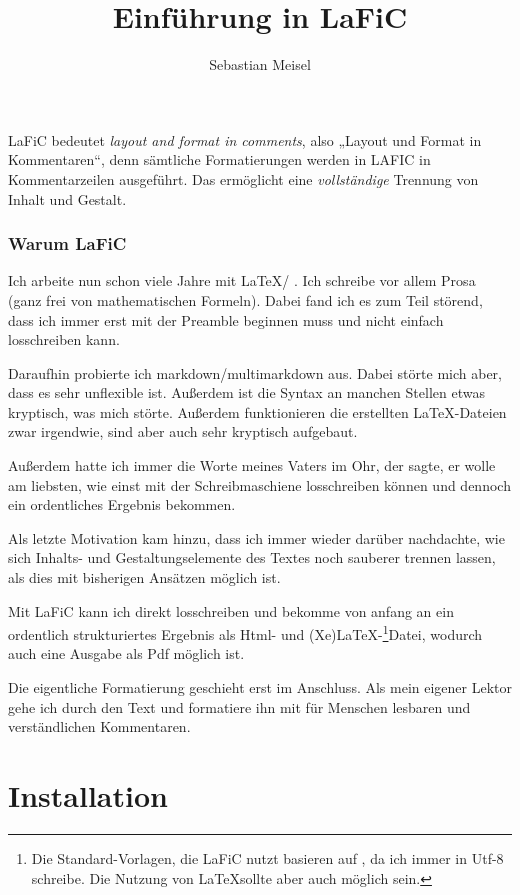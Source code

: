 \documentclass{scrartcl}
\title{Einführung in LaFiC}
\author{Sebastian Meisel}
\begin{document}
\maketitle


LaFiC bedeutet \textit{layout and format in comments}, also „Layout
und Format in Kommentaren“, denn sämtliche Formatierungen
werden in LAFIC in Kommentarzeilen ausgeführt. Das
ermöglicht eine \emph{vollständige} Trennung von Inhalt und
Gestalt.

\section{Warum LaFiC}

Ich arbeite nun schon viele Jahre mit \LaTeX / \XeLaTeX. Ich schreibe vor allem Prosa (ganz frei von mathematischen Formeln). Dabei fand ich es zum Teil störend, dass ich immer erst mit der Preamble beginnen muss und nicht einfach losschreiben kann.

Daraufhin probierte ich markdown/multimarkdown aus. Dabei störte mich aber, dass es sehr unflexible ist. Außerdem ist die Syntax an manchen Stellen etwas kryptisch, was mich störte. Außerdem funktionieren die erstellten \LaTeX-Dateien zwar irgendwie, sind aber auch sehr kryptisch aufgebaut.

Außerdem hatte ich immer die Worte meines Vaters im Ohr, der sagte, er wolle am liebsten, wie einst mit der Schreibmaschiene losschreiben können und dennoch ein ordentliches Ergebnis bekommen.

Als letzte Motivation kam hinzu, dass ich immer wieder darüber nachdachte, wie sich Inhalts- und Gestaltungselemente des Textes noch sauberer trennen lassen, als dies mit bisherigen Ansätzen möglich ist.

Mit LaFiC kann ich direkt losschreiben und bekomme von anfang an ein ordentlich strukturiertes Ergebnis als Html- und (Xe)LaTeX-\footnote{Die Standard-Vorlagen, die LaFiC nutzt basieren auf \XeLaTeX, da ich immer in Utf-8 schreibe. Die Nutzung von \LaTeX sollte aber auch möglich sein.}Datei, wodurch auch  eine Ausgabe als Pdf möglich ist.

Die eigentliche Formatierung geschieht erst im Anschluss. Als mein eigener Lektor gehe ich durch den Text und formatiere ihn mit für Menschen lesbaren und verständlichen Kommentaren.

\part{Installation}
\end{document}
